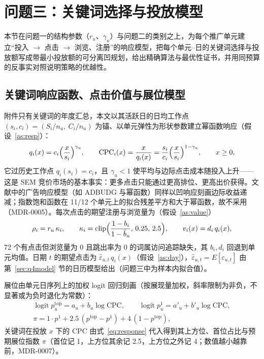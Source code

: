 \section{问题三：关键词选择与投放模型}
\label{sec:q3}
本节在问题一的结构参数（$r_u$、$\gamma_u$）与问题二的类别之上，为每个推广单元建立“投入 $\to$ 点击 $\to$ 浏览、注册”的响应模型，把每个单元--日的关键词选择与投放额写成带最小投放额的可分离凹规划，给出精确算法与最优性证书，并用同预算的反事实对照说明策略的优越性。

\subsection{关键词响应函数、点击价值与展位模型}
\label{sec:q3resp}
附件只有关键词的年度汇总，本文以其活跃日的日均工作点 $(s_i,c_i)=(S_i/n_u,\ C_i/n_u)$ 为锚、以单元弹性为形状参数建立幂函数响应（假设~\ref{as:resp}）：
\begin{equation}\label{eq:response}
q_i(x)=c_i\Bigl(\frac{x}{s_i}\Bigr)^{\gamma_u},\qquad
\mathrm{CPC}_i(x)=\frac{x}{q_i(x)}=\frac{s_i}{c_i}\Bigl(\frac{x}{s_i}\Bigr)^{1-\gamma_u},\qquad x\ge 0,
\end{equation}
它过历史工作点 $q_i(s_i)=c_i$，且 $\gamma_u<1$ 使平均与边际点击成本随投入上升——这是 SEM 竞价市场的基本事实\cite{edelman2007,varian2007}：更多点击只能通过更高排位、更高出价获得。文献中的广告响应模型（如 ADBUDG 与幂函数）同样以凹响应刻画边际收益递减\cite{little1979,hanssens2001}；指数饱和函数在 11/12 个单元上的拟合残差平方和大于幂函数，故不采用（MDR-0005）。每次点击的期望注册与浏览量为（假设~\ref{as:value}）
\begin{equation}\label{eq:value}
\rho_i=r_u\,\kappa_i,\qquad \kappa_i=\operatorname{clip}\Bigl(\frac{1-b_i}{1-\bar b_u},\,0.25,\,2.5\Bigr),\qquad v_i(x)=d_i\,q_i(x),
\end{equation}
72 个有点击但浏览量为 0 且跳出率为 0 的词属访问追踪缺失，其 $b_i,d_i$ 回退到单元均值。日期 $t$ 的期望点击为 $\hat\varepsilon_{u,t}\,q_i(x)$（假设~\ref{as:day}），$\hat\varepsilon_{u,t}=E[\varepsilon_{u,t}]$ 由第~\ref{sec:q4model} 节的日历模型给出（问题三中为样本内拟合值）。

展位由单元日序列上的加权 logit 回归刻画（按展现量加权，斜率限制为非负，不显著或为负时退化为常数）：
\begin{equation}\label{eq:position}
\begin{gathered}
\operatorname{logit}p^{\mathrm{top}}_{u}=a_u+b_u\log\mathrm{CPC},\qquad
\operatorname{logit}p^{1}_{u}=a'_u+b'_u\log\mathrm{CPC},\\
\pi=1\cdot p^{1}+2.5\,(p^{\mathrm{top}}-p^{1})+4\,(1-p^{\mathrm{top}}),
\end{gathered}
\end{equation}
关键词在投放 $x$ 下的 CPC 由式~\eqref{eq:response} 代入得到其上方位、首位占比与预期展位指数 $\pi$（首位记 1，上方位其余记 2.5，上方位之外记 4；数值越小越靠前，MDR-0007）。


